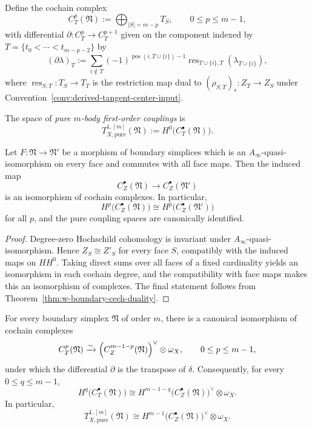 \begin{definition}
\label{def:w-tangent-restriction-complex}
Define the cochain complex
\[
C_T^p(\mathfrak N):=\bigoplus_{|S|=m-p} T_S,
\qquad 0\le p\le m-1,
\]
with differential $\partial\colon C_T^p\to C_T^{p+1}$ given on the component indexed by
$T=\{t_0<\cdots<t_{m-p-2}\}$ by
\[
(\partial\lambda)_T
:=
\sum_{i\notin T}(-1)^{\operatorname{pos}(i,T\cup\{i\})-1}
\operatorname{res}_{T\cup\{i\},T}(\lambda_{T\cup\{i\}}),
\]
where $\operatorname{res}_{S,T}\colon T_S\to T_T$ is the restriction map dual to
$(\rho_{S,T})_*\colon Z_T\to Z_S$ under Convention~\ref{conv:derived-tangent-center-input}.

The space of \emph{pure $m$-body first-order couplings} is
\[
T^{1,[m]}_{X,\mathrm{pure}}(\mathfrak N):=H^0\bigl(C_T^\bullet(\mathfrak N)\bigr).
\]
\end{definition}

\begin{lemma}
\label{lem:w-boundary-simplex-homotopy-invariance}
Let $F\colon \mathfrak N\to \mathfrak N'$ be a morphism of boundary simplices which is an
$A_\infty$-quasi-isomorphism on every face and commutes with all face maps. Then the induced map
\[
C_Z^\bullet(\mathfrak N)\longrightarrow C_Z^\bullet(\mathfrak N')
\]
is an isomorphism of cochain complexes. In particular,
\[
H^p\bigl(C_Z^\bullet(\mathfrak N)\bigr)
\cong
H^p\bigl(C_Z^\bullet(\mathfrak N')\bigr)
\]
for all $p$, and the pure coupling spaces are canonically identified.
\end{lemma}

\begin{proof}
Degree-zero Hochschild cohomology is invariant under $A_\infty$-quasi-isomorphism. Hence
$Z_S\cong Z'_S$ for every face $S$, compatibly with the induced maps on $HH^0$. Taking direct sums over all faces of a fixed cardinality yields an isomorphism in each cochain degree, and the compatibility with face maps makes this an isomorphism of complexes. The final statement follows from Theorem~\ref{thm:w-boundary-cech-duality}.
\end{proof}

\begin{theorem}
\label{thm:w-boundary-cech-duality}
For every boundary simplex $\mathfrak N$ of order $m$, there is a canonical isomorphism of cochain complexes
\[
C_T^p(\mathfrak N)
\xrightarrow{\sim}
\Bigl(C_Z^{m-1-p}(\mathfrak N)\Bigr)^\vee\otimes \omega_X,
\qquad 0\le p\le m-1,
\]
under which the differential $\partial$ is the transpose of $\delta$.
Consequently, for every $0\le q\le m-1$,
\[
H^q\bigl(C_T^\bullet(\mathfrak N)\bigr)
\cong
H^{m-1-q}\bigl(C_Z^\bullet(\mathfrak N)\bigr)^\vee\otimes \omega_X.
\]
In particular,
\[
T^{1,[m]}_{X,\mathrm{pure}}(\mathfrak N)
\cong
H^{m-1}\bigl(C_Z^\bullet(\mathfrak N)\bigr)^\vee\otimes \omega_X.
\]
\end{theorem}

